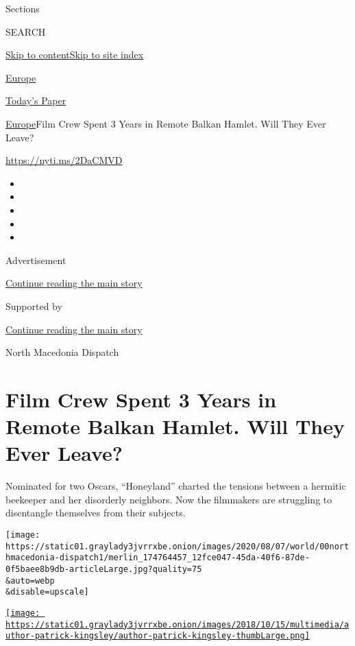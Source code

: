 Sections

SEARCH

\protect\hyperlink{site-content}{Skip to
content}\protect\hyperlink{site-index}{Skip to site index}

\href{https://www.nytimes3xbfgragh.onion/section/world/europe}{Europe}

\href{https://myaccount.nytimes3xbfgragh.onion/auth/login?response_type=cookie\&client_id=vi}{}

\href{https://www.nytimes3xbfgragh.onion/section/todayspaper}{Today's
Paper}

\href{/section/world/europe}{Europe}\textbar{}Film Crew Spent 3 Years in
Remote Balkan Hamlet. Will They Ever Leave?

\url{https://nyti.ms/2DaCMVD}

\begin{itemize}
\item
\item
\item
\item
\item
\end{itemize}

Advertisement

\protect\hyperlink{after-top}{Continue reading the main story}

Supported by

\protect\hyperlink{after-sponsor}{Continue reading the main story}

North Macedonia Dispatch

\hypertarget{film-crew-spent-3-years-in-remote-balkan-hamlet-will-they-ever-leave}{%
\section{Film Crew Spent 3 Years in Remote Balkan Hamlet. Will They Ever
Leave?}\label{film-crew-spent-3-years-in-remote-balkan-hamlet-will-they-ever-leave}}

Nominated for two Oscars, ``Honeyland'' charted the tensions between a
hermitic beekeeper and her disorderly neighbors. Now the filmmakers are
struggling to disentangle themselves from their subjects.

\texttt{[image: https://static01.graylady3jvrrxbe.onion/images/2020/08/07/world/00northmacedonia-dispatch1/merlin\_174764457\_12fce047-45da-40f6-87de-0f5baee8b9db-articleLarge.jpg?quality=75\\\&auto=webp\\\&disable=upscale]}

\href{https://www.nytimes3xbfgragh.onion/by/patrick-kingsley}{\texttt{[image: https://static01.graylady3jvrrxbe.onion/images/2018/10/15/multimedia/author-patrick-kingsley/author-patrick-kingsley-thumbLarge.png]}}


